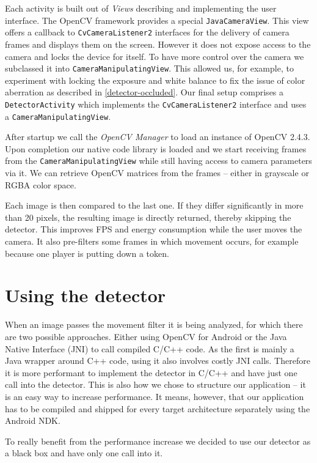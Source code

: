 	Each activity is built out of \textit{Views} describing and implementing the user interface. The OpenCV framework provides a special \texttt{JavaCameraView}. This view offers a callback to \texttt{CvCameraListener2} interfaces for the delivery of camera frames and displays them on the screen. However it does not expose access to the camera and locks the device for itself. To have more control over the camera we subclassed it into \texttt{CameraManipulatingView}. This allowed us, for example, to experiment with locking the exposure and white balance to fix the issue of color aberration as described in \autoref{detector-occluded}. Our final setup comprises a \texttt{DetectorActivity} which implements the \texttt{CvCameraListener2} interface and uses a \texttt{CameraManipulatingView}.

	After startup we call the \textit{OpenCV Manager} to load an instance of OpenCV 2.4.3. Upon completion our native code library is loaded and we start receiving frames from the \texttt{CameraManipulatingView} while still having access to camera parameters via it. We can retrieve OpenCV matrices from the frames -- either in grayscale or RGBA color space.

	Each image is then compared to the last one. If they differ significantly in more than 20 pixels, the resulting image is directly returned, thereby skipping the detector. This improves FPS and energy consumption while the user moves the camera. It also pre-filters some frames in which movement occurs, for example because one player is putting down a token.

	\section{Using the detector}
	\label{android-detector}
	When an image passes the movement filter it is being analyzed, for which there are two possible approaches. Either using OpenCV for Android or the Java Native Interface (JNI) to call compiled C/C++ code. As the first is mainly a Java wrapper around C++ code, using it also involves costly JNI calls. Therefore it is more performant to implement the detector in C/C++ and have just one call into the detector. This is also how we chose to structure our application -- it is an easy way to increase performance. It means, however, that our application has to be compiled and shipped for every target architecture separately using the Android NDK.

	To really benefit from the performance increase we decided to use our detector as a black box and have only one call into it.


